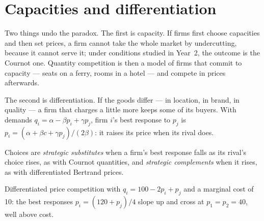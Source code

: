 \section{Capacities and differentiation}\label{sec:b1:cournot-and-bertrand:soften}

Two things undo the paradox. The first is capacity. If firms first choose
capacities and then set prices, a firm cannot take the whole market by
undercutting, because it cannot serve it; under conditions studied in
Year~2, the outcome is the Cournot one. Quantity competition is then a model
of firms that commit to capacity --- seats on a ferry, rooms in a hotel ---
and compete in prices afterwards.

The second is differentiation. If the goods differ --- in location, in
brand, in quality --- a firm that charges a little more keeps some of its
buyers. With demands $q_i = \alpha - \beta p_i + \gamma p_j$, firm $i$'s best response to
$p_j$ is $p_i = (\alpha + \beta c + \gamma p_j)/(2\beta)$: it raises its price when its rival does.

\begin{definition}\label{def:b1:cournot-and-bertrand:strategic}
Choices are \emph{strategic substitutes} when a firm's best response falls
as its rival's choice rises, as with Cournot quantities, and
\emph{strategic complements} when it rises, as with differentiated Bertrand
prices.
\end{definition}

\begin{omfigure}

{\small Differentiated price competition with $q_i = 100 - 2p_i + p_j$ and a
marginal cost of 10: the best responses $p_i = (120 + p_j)/4$ slope up and cross at
$p_1 = p_2 = 40$, well above cost.}
\end{omfigure}

